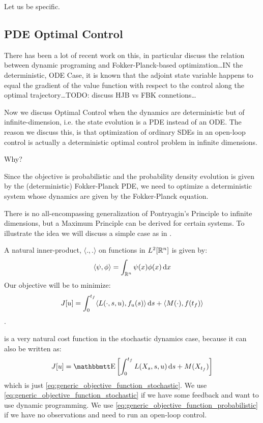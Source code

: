 Let us be specific. 
  
  
\subsection{PDE Optimal Control}
There has been a lot of recent work on this, in particular \cite{Annunziato2014}
discuss the relation between dynamic programing and Fokker-Planck-based
optimization\ldots IN the deterministic, ODE Case, it is known that the adjoint
state variable happens to equal the gradient of the value function with respect
to the control along the optimal trajectory\ldots TODO: discuss HJB vs FBK
connetions\ldots


Now we discuss Optimal Control when the dynamics are deterministic but of
infinite-dimension, i.e. the state evolution is a PDE instead of an ODE.  The
reason we discuss this, is that optimization of ordinary SDEs in an open-loop
control is actually a deterministic optimal control problem in infinite
dimensions.

Why?

Since the objective is probabilistic and the probability density evolution is
given by the (deterministic) Fokker-Planck PDE, we need to optimize a
deterministic system whose dynamics are given by the Fokker-Planck equation.

There is no all-encompassing generalization of Pontryagin's Principle to
infinite dimensions, but a Maximum Principle can be derived for certain systems.
To illustrate the idea we will discuss a simple case as in \cite{Palmer2011}.

A natural inner-product, $ \langle.,. \rangle$ on functions in $L^2[{ \mathbb{R} }^n]$ is
given by: $$
 \langle\psi,\phi  \rangle = \int_{{ \mathbb{R} }^n} \psi(x) \phi(x) \, \mathrm{d} x
$$
Our objective will be to minimize:
\begin{equation}
J[u] = \int_0^{ t_f }  \langle L(\cdot,s,u), {f}_u(s) \rangle \, \mathrm{d} s +  
\langle M(\cdot),{f}({ t_f }) \rangle
\label{eq:generic_objective_function_probabilistic}  
\end{equation}.

 is a very natural cost
function in the stochastic dynamics case, because it can also be written as: 
$$
J[u] = \Exp \left[ \int_0^\tf  L(X_s, s,u) \intd{s} + M(X_\tf) \right] 
$$ which
is just \cref{eq:generic_objective_function_stochastic}. We use
\cref{eq:generic_objective_function_stochastic} if we have some feedback and
want to use dynamic programming. We use
\cref{eq:generic_objective_function_probabilistic} if we have no observations
and need to run an open-loop control.

